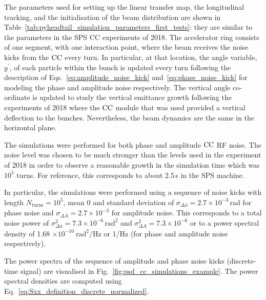 The parameters used for setting up the linear transfer map, the longitudinal tracking, and the initialisation of the beam distribution are shown in Table~\ref{tab:pyheadtail_simulation_parameters_first_tests}: they are similar to the parameters in the SPS CC experiments of 2018. The accelerator ring consists of one segment, with one interaction point, where the beam receives the noise kicks from the ${\mathrm{CC}}$ every turn. In particular, at that location, the angle variable, $y^\prime$, of each particle within the bunch is updated every turn following the description of Eqs.~\eqref{eq:amplitude_noise_kick} and~\eqref{eq:phase_noise_kick} for modeling the phase and amplitude noise respectively. The vertical angle co-ordinate is updated to study the vertical emittance growth following the experiments of 2018 where the ${\mathrm{CC}}$ module that was used provided a vertical deflection to the bunches. Nevertheless, the beam dynamics are the same in the horizontal plane.

The simulations were performed for both phase and amplitude ${\mathrm{CC}}$ RF noise. The noise level was chosen to be much stronger than the levels used in the experiment of 2018 in order to observe a reasonable growth in the simulation time which was $10^5$ turns. For reference, this corresponds to about 2.5\,s in the SPS machine. 

In particular, the simulations were performed using a sequence of noise kicks with length $N_\mathrm{turns}=10^5$, mean 0 and standard deviation of $\sigma_{\Delta \phi}=2.7\times 10^{-3}$\,rad for phase noise and $\sigma_{\Delta A}=2.7\times 10^{-3}$ for amplitude noise. This corresponds to a total noise power of $\sigma_{\Delta \phi}^2 =7.3 \times 10^{-6} \, \mathrm{rad^2}$ and $\sigma_{\Delta A}^2 =7.3 \times 10^{-6}$ or to a power spectral density of 1.68 $\times 10^{-10} \ \mathrm{rad^2/Hz}$ or 1/Hz (for phase and amplitude noise respectively).


The power spectra of the sequence of amplitude and phase noise kicks (discrete-time signal) are visualised in Fig.~\ref{fig:psd_cc_simulations_example}. The power spectral densities are computed using Eq.~\eqref{eq:Sxx_definition_discrete_normalized}.

